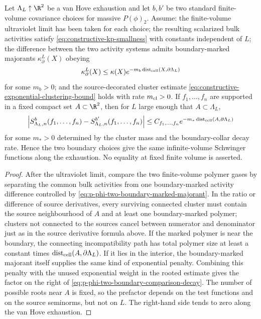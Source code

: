 \begin{theorem}
\label{thm:p-phi-two-boundary-comparison}
Let \(\Lambda_L\uparrow\R^2\) be a van Hove exhaustion and let \(b,b'\) be two
standard finite-volume covariance choices for massive \(P(\phi)_2\).  Assume:
the finite-volume ultraviolet limit has been taken for each choice; the
resulting scalarized bulk activities satisfy
\eqref{eq:constructive-kp-smallness} with constants independent of \(L\);
the difference between the two activity systems admits boundary-marked
majorants \(\kappa_\partial^L(X)\) obeying
\begin{equation}
  \kappa_\partial^L(X)
  \leq
  \kappa(X)e^{-m_b\operatorname{dist}_{\rm cell}(X,\partial\Lambda_L)}
  \label{eq:p-phi-two-boundary-marked-majorant}
\end{equation}
for some \(m_b>0\); and the source-decorated cluster estimate
\eqref{eq:constructive-exponential-clustering-bound} holds with rate
\(m_{\rm cl}>0\).  If \(f_1,\ldots,f_n\) are supported in a fixed compact set
\(A\subset\R^2\), then for \(L\) large enough that \(A\subset\Lambda_L\),
\begin{equation}
  \left|
    S_{\Lambda_L,n}^{b}(f_1,\ldots,f_n)
    -
    S_{\Lambda_L,n}^{b'}(f_1,\ldots,f_n)
  \right|
  \leq
  C_{f_1,\ldots,f_n}
  e^{-m_*\operatorname{dist}_{\rm cell}(A,\partial\Lambda_L)}
  \label{eq:p-phi-two-boundary-comparison-decay}
\end{equation}
for some \(m_*>0\) determined by the cluster mass and the boundary-collar
decay rate.  Hence the two boundary choices give the same infinite-volume
Schwinger functions along the exhaustion.  No equality at fixed finite volume
is asserted.
\end{theorem}

\begin{proof}
After the ultraviolet limit, compare the two finite-volume polymer gases by
separating the common bulk activities from one boundary-marked activity
difference controlled by
\eqref{eq:p-phi-two-boundary-marked-majorant}.  In the ratio or difference of
source derivatives, every surviving connected cluster must contain the source
neighbourhood of \(A\) and at least one boundary-marked polymer; clusters not
connected to the sources cancel between numerator and denominator just as in
the source derivative formula above.  If the marked polymer is near the
boundary, the connecting incompatibility path has total polymer size at least
a constant times \(\operatorname{dist}_{\rm cell}(A,\partial\Lambda_L)\).  If
it lies in the interior, the boundary-marked majorant itself supplies the same
kind of exponential penalty.  Combining this penalty with the unused
exponential weight in the rooted estimate gives the factor on the right of
\eqref{eq:p-phi-two-boundary-comparison-decay}.  The number of possible roots
near \(A\) is fixed, so the prefactor depends on the test functions and on the
source seminorms, but not on \(L\).  The right-hand side tends to zero along
the van Hove exhaustion.
\end{proof}

